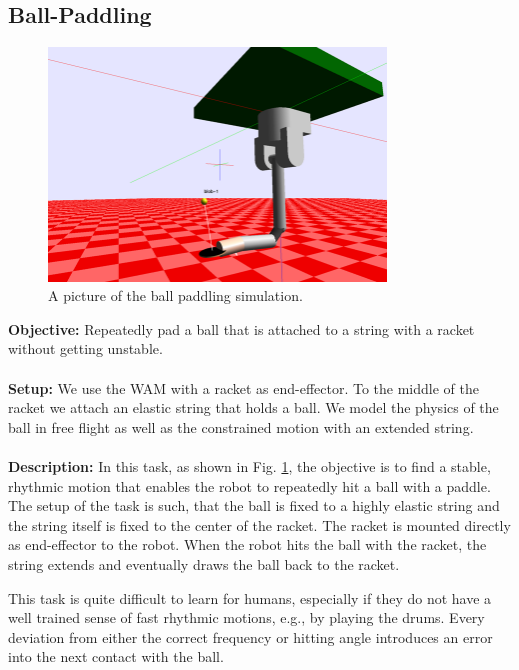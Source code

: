 \documentclass[11pt, article, colorback]{article}
\begin{document}
\subsection{Ball-Paddling}
\begin{figure}
\centering
 \includegraphics[width=0.8\textwidth]{Pics/PaddleBall.png}
  \caption{A picture of the ball paddling simulation.}
  \label{pic:ballPaddling}
\end{figure}
%
\textbf{Objective:}  Repeatedly pad a ball that is attached to a string with a racket without getting unstable. \\ \\
%
\textbf{Setup:}  We use the WAM with a racket as end-effector. To the middle of the racket we attach an 
elastic string that holds a ball. We model the physics of the ball in free flight as well as the constrained motion 
with an extended string.  \\ \\ 
%
\textbf{Description:}
In this task, as shown in Fig. \ref{pic:ballPaddling}, the objective is to find a stable, rhythmic motion that enables the robot to repeatedly hit a ball 
with a paddle. The setup of the task is such, that the ball is fixed to a highly elastic string and the string itself 
is fixed to the center of the racket. The racket is mounted directly 
as end-effector to the robot. When the robot hits the ball with the racket, the string extends and eventually draws the ball back to the 
racket. 

This task is quite difficult to learn for humans, especially if they do not have a well trained sense of fast rhythmic motions, 
e.g., by playing the drums. Every deviation from either the correct frequency or hitting angle introduces an error into the 
next contact with the ball. 
\end{document}
